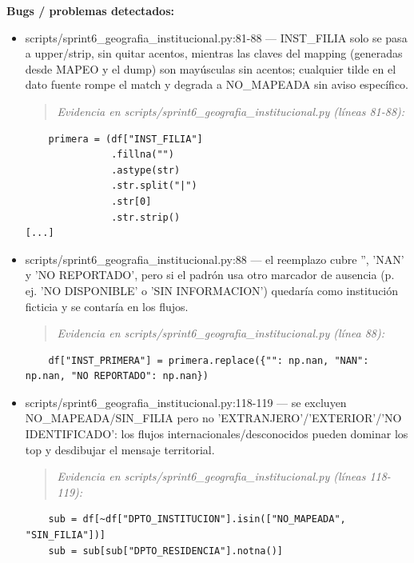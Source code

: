 \begin{tcolorbox}[riesgo]
\textbf{Bugs / problemas detectados:}
\begin{itemize}
  \item scripts/sprint6\_geografia\_institucional.py:81-88 --- INST\_FILIA solo se pasa a upper/strip, sin quitar acentos, mientras las claves del mapping (generadas desde MAPEO y el dump) son mayúsculas sin acentos; cualquier tilde en el dato fuente rompe el match y degrada a NO\_MAPEADA sin aviso específico.
\begin{quote}\footnotesize\ttfamily
\noindent\emph{Evidencia en scripts/sprint6\_geografia\_institucional.py (líneas 81-88):}
\end{quote}
\begin{lstlisting}
    primera = (df["INST_FILIA"]
               .fillna("")
               .astype(str)
               .str.split("|")
               .str[0]
               .str.strip()
[...]
\end{lstlisting}

  \item scripts/sprint6\_geografia\_institucional.py:88 --- el reemplazo cubre '', 'NAN' y 'NO REPORTADO', pero si el padrón usa otro marcador de ausencia (p. ej. 'NO DISPONIBLE' o 'SIN INFORMACION') quedaría como institución ficticia y se contaría en los flujos.
\begin{quote}\footnotesize\ttfamily
\noindent\emph{Evidencia en scripts/sprint6\_geografia\_institucional.py (línea 88):}
\end{quote}
\begin{lstlisting}
    df["INST_PRIMERA"] = primera.replace({"": np.nan, "NAN": np.nan, "NO REPORTADO": np.nan})
\end{lstlisting}

  \item scripts/sprint6\_geografia\_institucional.py:118-119 --- se excluyen NO\_MAPEADA/SIN\_FILIA pero no 'EXTRANJERO'/'EXTERIOR'/'NO IDENTIFICADO': los flujos internacionales/desconocidos pueden dominar los top y desdibujar el mensaje territorial.
\begin{quote}\footnotesize\ttfamily
\noindent\emph{Evidencia en scripts/sprint6\_geografia\_institucional.py (líneas 118-119):}
\end{quote}
\begin{lstlisting}
    sub = df[~df["DPTO_INSTITUCION"].isin(["NO_MAPEADA", "SIN_FILIA"])]
    sub = sub[sub["DPTO_RESIDENCIA"].notna()]
\end{lstlisting}


\end{itemize}
\end{tcolorbox}

